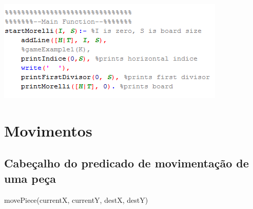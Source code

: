 \documentclass[a4paper]{article}
\begin{document}
\includegraphics[scale=1]{code2.png}\linebreak\linebreak

\newpage
\section{Movimentos}
\subsection{Cabeçalho do predicado de movimentação de uma peça}
movePiece(currentX, currentY, destX, destY)
\end{document}
